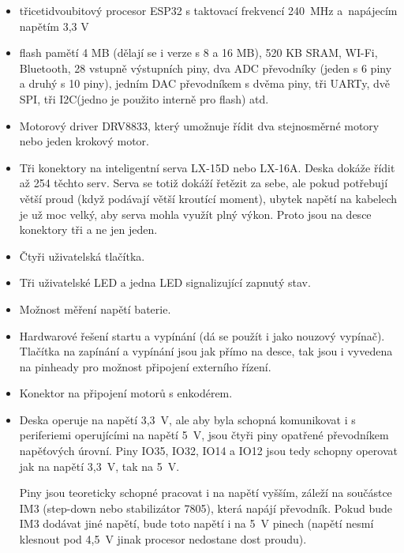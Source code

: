 \documentclass{template/socthesis}
\begin{document}
\begin{itemize}
	\item třicetidvoubitový procesor ESP32 s taktovací frekvencí 240~MHz 
	a~na\-pá\-je\-cím napětím 3,3 V 
	\item flash pamětí 4 MB (dělají se i verze s 8 a 16 MB), 520 KB SRAM, WI-Fi, Bluetooth, 28 vstupně výstupních piny, dva ADC převodníky (jeden s 6 piny a druhý s 10 piny), jedním DAC převodníkem s dvěma piny, tři UARTy, dvě SPI, tři I2C(jedno je použito interně pro flash) atd.
	
	\item Motorový driver DRV8833, který umožnuje řídit dva stejnosměrné motory nebo jeden krokový motor.
	
	\item Tři konektory na inteligentní serva LX-15D nebo LX-16A. Deska dokáže řídit až 254 těchto serv. Serva se totiž dokáží řetězit za sebe, ale pokud potřebují větší proud (když podávají větší kroutící moment), ubytek napětí na kabelech je už moc velký, aby serva mohla využít plný výkon. Proto jsou na desce konektory tři a ne jen jeden.
	
	\item Čtyři uživatelská tlačítka.
	
	\item Tři uživatelské LED a jedna LED signalizující zapnutý stav.
	
	\item Možnost měření napětí baterie.
	
	\item Hardwarové řešení startu a vypínání (dá se použít i jako nouzový vypínač). Tlačítka na zapínání a vypínání jsou jak přímo na desce, tak jsou i vyvedena na pinheady pro možnost připojení externího řízení.
	
	\item Konektor na připojení motorů s enkodérem.
	
	\item Deska operuje na napětí 3,3~V, ale aby byla schopná komunikovat i s periferiemi operujícími
	na napětí 5~V, jsou čtyři piny opatřené převodníkem napěťových úrovní.
	Piny IO35, IO32, IO14 a IO12 jsou tedy schopny operovat jak na napětí 3,3~V, tak na 5~V.
	
	Piny jsou teoreticky schopné pracovat i na napětí vyšším, záleží na součástce IM3
	(step-down nebo stabilizátor 7805), která napájí pře\-vod\-ník. Pokud bude IM3 dodávat jiné napětí, bude toto napětí i na 5~V pinech (napětí nesmí klesnout pod 4,5~V jinak procesor nedostane dost proudu).
	

\end{itemize}
\end{document}

